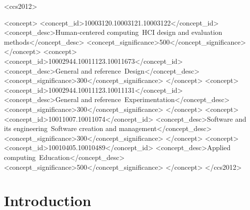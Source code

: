 \documentclass[manuscript,review,anonymous]{acmart}%
\begin{document}
\begin{CCSXML}
<ccs2012>

<concept>
<concept_id>10003120.10003121.10003122</concept_id>
<concept_desc>Human-centered computing~HCI design and evaluation methods</concept_desc>
<concept_significance>500</concept_significance>
</concept>
<concept>
<concept_id>10002944.10011123.10011673</concept_id>
<concept_desc>General and reference~Design</concept_desc>
<concept_significance>300</concept_significance>
</concept>
<concept>
<concept_id>10002944.10011123.10011131</concept_id>
<concept_desc>General and reference~Experimentation</concept_desc>
<concept_significance>300</concept_significance>
</concept>
<concept>
<concept_id>10011007.10011074</concept_id>
<concept_desc>Software and its engineering~Software creation and management</concept_desc>
<concept_significance>300</concept_significance>
</concept>
<concept>
<concept_id>10010405.10010489</concept_id>
<concept_desc>Applied computing~Education</concept_desc>
<concept_significance>500</concept_significance>
</concept>
</ccs2012>
\end{CCSXML}




\maketitle

\section{Introduction}
\end{document}
